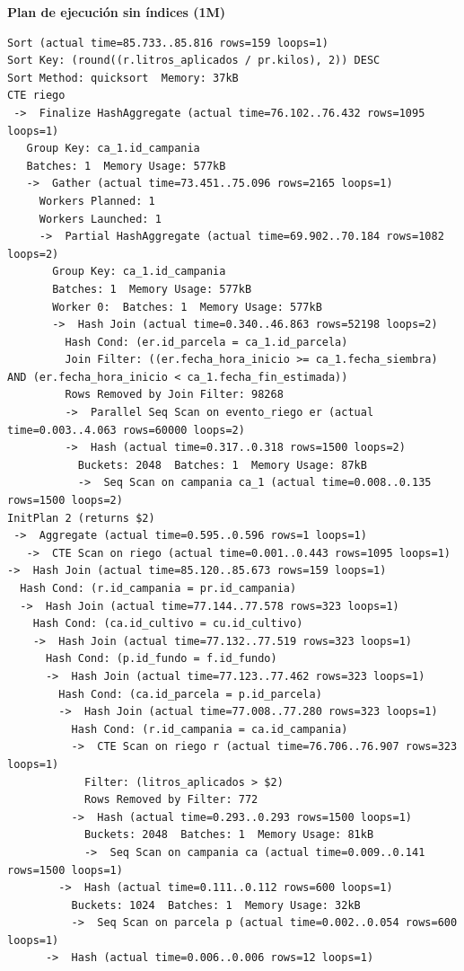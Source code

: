 \documentclass[11pt,letterpaper]{article}
\begin{document}
\textbf{Plan de ejecución sin índices (1M)}
\begin{lstlisting}[style=plano]
Sort (actual time=85.733..85.816 rows=159 loops=1)
Sort Key: (round((r.litros_aplicados / pr.kilos), 2)) DESC
Sort Method: quicksort  Memory: 37kB
CTE riego
 ->  Finalize HashAggregate (actual time=76.102..76.432 rows=1095 loops=1)
   Group Key: ca_1.id_campania
   Batches: 1  Memory Usage: 577kB
   ->  Gather (actual time=73.451..75.096 rows=2165 loops=1)
     Workers Planned: 1
     Workers Launched: 1
     ->  Partial HashAggregate (actual time=69.902..70.184 rows=1082 loops=2)
       Group Key: ca_1.id_campania
       Batches: 1  Memory Usage: 577kB
       Worker 0:  Batches: 1  Memory Usage: 577kB
       ->  Hash Join (actual time=0.340..46.863 rows=52198 loops=2)
         Hash Cond: (er.id_parcela = ca_1.id_parcela)
         Join Filter: ((er.fecha_hora_inicio >= ca_1.fecha_siembra) AND (er.fecha_hora_inicio < ca_1.fecha_fin_estimada))
         Rows Removed by Join Filter: 98268
         ->  Parallel Seq Scan on evento_riego er (actual time=0.003..4.063 rows=60000 loops=2)
         ->  Hash (actual time=0.317..0.318 rows=1500 loops=2)
           Buckets: 2048  Batches: 1  Memory Usage: 87kB
           ->  Seq Scan on campania ca_1 (actual time=0.008..0.135 rows=1500 loops=2)
InitPlan 2 (returns $2)
 ->  Aggregate (actual time=0.595..0.596 rows=1 loops=1)
   ->  CTE Scan on riego (actual time=0.001..0.443 rows=1095 loops=1)
->  Hash Join (actual time=85.120..85.673 rows=159 loops=1)
  Hash Cond: (r.id_campania = pr.id_campania)
  ->  Hash Join (actual time=77.144..77.578 rows=323 loops=1)
    Hash Cond: (ca.id_cultivo = cu.id_cultivo)
    ->  Hash Join (actual time=77.132..77.519 rows=323 loops=1)
      Hash Cond: (p.id_fundo = f.id_fundo)
      ->  Hash Join (actual time=77.123..77.462 rows=323 loops=1)
        Hash Cond: (ca.id_parcela = p.id_parcela)
        ->  Hash Join (actual time=77.008..77.280 rows=323 loops=1)
          Hash Cond: (r.id_campania = ca.id_campania)
          ->  CTE Scan on riego r (actual time=76.706..76.907 rows=323 loops=1)
            Filter: (litros_aplicados > $2)
            Rows Removed by Filter: 772
          ->  Hash (actual time=0.293..0.293 rows=1500 loops=1)
            Buckets: 2048  Batches: 1  Memory Usage: 81kB
            ->  Seq Scan on campania ca (actual time=0.009..0.141 rows=1500 loops=1)
        ->  Hash (actual time=0.111..0.112 rows=600 loops=1)
          Buckets: 1024  Batches: 1  Memory Usage: 32kB
          ->  Seq Scan on parcela p (actual time=0.002..0.054 rows=600 loops=1)
      ->  Hash (actual time=0.006..0.006 rows=12 loops=1)

\end{lstlisting}
\end{document}
